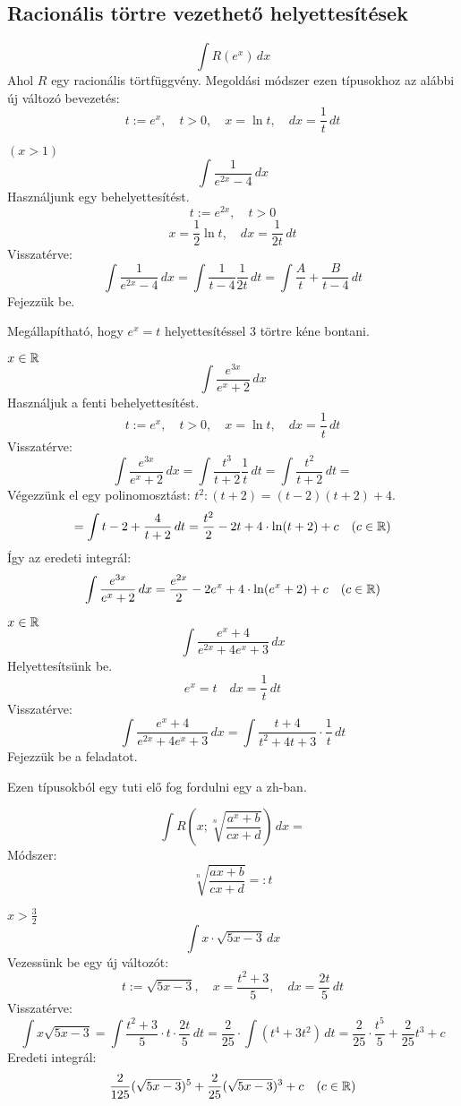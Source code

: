 \documentclass[a4paper,11.5pt]{article}
\begin{document}
	\subsection{Racionális törtre vezethető helyettesítések}
	\begin{example}
		\[ \int R(e^x)\,dx \]
		Ahol $R$ egy racionális törtfüggvény.
		Megoldási módszer ezen típusokhoz az alábbi új változó bevezetés:
		\[ t:=e^x,\quad t>0,\quad x=\ln t,\quad dx=\frac{1}{t}\,dt \]
	\end{example}
	\begin{exercise}$(x>1)$
		\[ \int\frac{1}{e^{2x}-4}\,dx \]
		Használjunk egy behelyettesítést.
		\[ t:=e^{2x},\quad t>0 \]
		\[ x=\frac{1}{2}\ln t,\quad dx=\frac{1}{2t}\,dt \]
		Visszatérve:
		\[ \int\frac{1}{e^{2x}-4}\,dx=\int\frac{1}{t-4}\frac{1}{2t}\,dt=\int\frac{A}{t}+\frac{B}{t-4}\,dt \]
		Fejezzük be.
	\end{exercise}
	\begin{note}
		Megállapítható, hogy $e^x=t$ helyettesítéssel 3 törtre kéne bontani.
	\end{note}
	\begin{task}$x\in\mathbb{R}$
		\[ \int\frac{e^{3x}}{e^x+2}\,dx \]
		Használjuk a fenti behelyettesítést.
		\[ t:=e^x,\quad t>0,\quad x=\ln t,\quad dx=\frac{1}{t}\,dt \]
		Visszatérve:
		\[ \int\frac{e^{3x}}{e^x+2}\,dx=\int\frac{t^3}{t+2}\frac{1}{t}\,dt=\int\frac{t^2}{t+2}\,dt= \]
		Végezzünk el egy polinomosztást: \quad $t^2 : (t+2)=(t-2)(t+2)+4$.
		\[ =\int t-2+\frac{4}{t+2}\,dt=\frac{t^2}{2}-2t+4\cdot\ln(t+2)+c\quad (c\in\mathbb{R}) \]
		Így az eredeti integrál:
		\[ \int\frac{e^{3x}}{e^x+2}\,dx=\frac{e^{2x}}{2}-2e^x+4\cdot\ln(e^x+2)+c\quad (c\in\mathbb{R}) \]
	\end{task}
	\begin{exercise}$x\in\mathbb{R}$
		\[ \int\frac{e^x+4}{e^{2x}+4e^x+3}\,dx \]
		Helyettesítsünk be.
		\[ e^x=t\quad dx=\frac{1}{t}\,dt \]
		Visszatérve:
		\[ \int\frac{e^x+4}{e^{2x}+4e^x+3}\,dx=\int\frac{t+4}{t^2+4t+3}\cdot\frac{1}{t}\,dt \]
		Fejezzük be a feladatot.
	\end{exercise}
	\begin{note}
		Ezen típusokból egy tuti elő fog fordulni egy a zh-ban.
	\end{note}
	\begin{example}
		\[ \int R\left(x;\sqrt[n]{\frac{a^x+b}{cx+d}}\right)\,dx= \]
		Módszer:
		\[ \sqrt[n]{\frac{ax+b}{cx+d}}=:t \]
	\end{example}
	\begin{task}$x>\frac{3}{2}$
		\[ \int x\cdot\sqrt{5{x}-3}\,dx \]
		Vezessünk be egy új változót:
		\[ t:=\sqrt{5x-3},\quad x=\frac{t^2+3}{5},\quad dx=\frac{2t}{5}\,dt \]
		Visszatérve:
		\[ \int x\sqrt{5x-3}=\int\frac{t^2+3}{5}\cdot t\cdot\frac{2t}{5}\,dt=\frac{2}{25}\cdot\int(t^4+3t^2)\,dt=\frac{2}{25}\cdot\frac{t^5}{5}+\frac{2}{25}t^3+c \]
		Eredeti integrál:
		\[ \frac{2}{125}(\sqrt{5x-3})^5+\frac{2}{25}(\sqrt{5x-3})^3+c\quad (c\in\mathbb{R}) \]
	\end{task}
\end{document}
